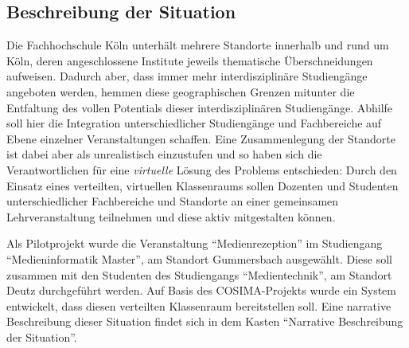 
\subsection{Beschreibung der Situation} %
\label{sub:beschreibung_des_szenario}

  Die Fachhochschule Köln unterhält mehrere Standorte innerhalb und rund um Köln, deren angeschlossene Institute jeweils thematische Überschneidungen aufweisen. Dadurch aber, dass immer mehr interdisziplinäre Studiengänge angeboten werden, hemmen diese geographischen Grenzen mitunter die Entfaltung des vollen Potentials dieser interdisziplinären Studiengänge. Abhilfe soll hier die Integration unterschiedlicher Studiengänge und Fachbereiche auf Ebene einzelner Veranstaltungen schaffen. Eine Zusammenlegung der Standorte ist dabei aber als unrealistisch einzustufen und so haben sich die Verantwortlichen für eine \emph{virtuelle} Lösung des Problems entschieden: Durch den Einsatz eines verteilten, virtuellen Klassenraums sollen Dozenten und Studenten unterschiedlicher Fachbereiche und Standorte an einer gemeinsamen Lehrveranstaltung teilnehmen und diese aktiv mitgestalten können.

  Als Pilotprojekt wurde die Veranstaltung "`Medienrezeption"' im Studiengang "`Medieninformatik Master"', am Standort Gummersbach ausgewählt. Diese soll zusammen mit den Studenten des Studiengangs "`Medientechnik"', am Standort Deutz durchgeführt werden. Auf Basis des COSIMA-Projekts wurde ein System entwickelt, dass diesen verteilten Klassenraum bereitstellen soll. Eine narrative Beschreibung dieser Situation findet sich in dem Kasten "`Narrative Beschreibung der Situation"'.
  
